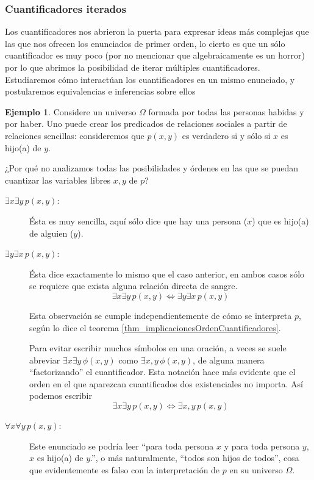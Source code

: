 \documentclass{book}
\theoremstyle{definition}
\newtheorem{ejm}{Ejemplo}[chapter]
\begin{document}
\subsubsection{Cuantificadores iterados}
Los cuantificadores nos abrieron la puerta para expresar ideas más complejas que las que nos ofrecen los enunciados de primer orden, lo cierto es que un sólo cuantificador es muy poco (por no mencionar que algebraicamente es un horror) por lo que abrimos la posibilidad de iterar múltiples cuantificadores.
Estudiaremos cómo interactúan los cuantificadores en un mismo enunciado, y postularemos equivalencias e inferencias sobre ellos

\begin{ejm}\label{ej_relaciónPadre}
	Considere un universo $\Omega$ formada por todas las personas habidas y por haber. Uno puede crear los predicados de relaciones sociales a partir de relaciones sencillas:
	consideremos que $p(x,y)$ es verdadero si y sólo si $x$ es hijo(a) de $y$.
	
	¿Por qué no analizamos todas las posibilidades y órdenes en las que se puedan cuantizar las variables libres $x,y$ de $p$?
	
	\begin{description}
		\item[$\exists x \exists y\, p(x,y)$:] Ésta es muy sencilla, aquí sólo dice que hay una persona ($x$) que es hijo(a) de alguien ($y$).
		\item[$\exists y \exists x\, p(x,y)$:] Ésta dice exactamente lo mismo que el caso anterior, en ambos casos sólo se requiere que exista alguna relación directa de sangre.
		\[\exists x \exists y\, p(x,y)\iff\exists y \exists x\, p(x,y) \]
		
		Esta observación se cumple independientemente de cómo se interpreta $p$, según lo dice el teorema \ref{thm_implicacionesOrdenCuantificadores}.
		
		Para evitar escribir muchos símbolos en una oración, a veces se suele abreviar $\exists x \exists y\, \phi(x,y)$ como $\exists x,y\, \phi(x,y)$, de alguna manera ``factorizando'' el cuantificador.
		Esta notación hace más evidente que el orden en el que aparezcan cuantificados dos existenciales no importa.
		Así podemos escribir
			\[\exists x \exists y\, p(x,y)\iff\exists x,y\, p(x,y) \]
			
	\item[$\forall x \forall y\, p(x,y)$:] Este enunciado se podría leer	``para toda persona $x$ y para toda persona $y$, $x$ es hijo(a) de $y$.'', o más naturalmente, ``todos son hijos de todos'', cosa que evidentemente es falso con la interpretación de $p$ en su universo $\Omega$.
	

\end{description}
\end{ejm}
\end{document}
